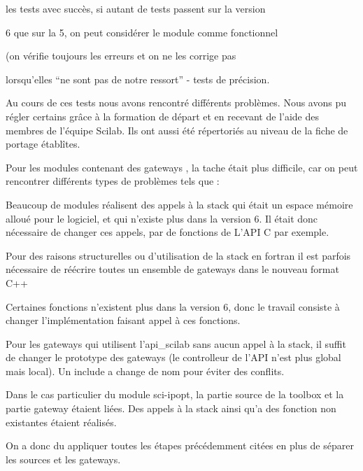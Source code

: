 les tests avec succès, si autant de tests passent sur la version

6 que sur la 5, on peut considérer le module comme fonctionnel

(on vérifie toujours les erreurs et on ne les corrige pas

lorsqu’elles “ne sont pas de notre ressort” - tests de précision.

Au cours de ces tests nous avons rencontré différents problèmes. Nous avons pu régler certains grâce  à la  formation de départ et en recevant de l’aide des membres de l'équipe Scilab. Ils ont aussi été répertoriés au niveau de la fiche de portage établîtes.

Pour les modules contenant des gateways , la tache était plus difficile, car on peut rencontrer différents types de problèmes tels que :

Beaucoup de modules réalisent des appels à la stack qui était un espace mémoire alloué pour le logiciel, et qui n’existe plus dans la version 6. Il était donc nécessaire de changer ces appels, par de fonctions de L’API C par exemple.

Pour des raisons structurelles ou d’utilisation de la stack en fortran il est parfois nécessaire de réécrire toutes un ensemble de gateways dans le nouveau format C++

Certaines fonctions n’existent plus dans la version 6, donc le travail consiste à changer l’implémentation faisant appel à ces fonctions. 

Pour les gateways qui utilisent l’api\_scilab sans aucun appel à la stack, il suffit de changer le prototype des gateways (le controlleur de l’API n’est plus global mais local). Un include a change de nom pour éviter des conflits.

Dans le cas particulier du module sci-ipopt, la partie source de la toolbox et la partie gateway étaient liées. Des appels à la stack ainsi qu’a des fonction non existantes étaient réalisés. 

On a donc du appliquer toutes les étapes précédemment citées en plus de séparer les sources et les gateways.

